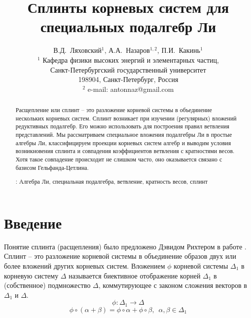 \documentclass[12pt]{article}
\begin{document}
\title{Сплинты корневых систем для специальных подалгебр Ли}

\author{В.Д.~Ляховский$^1$, А.А.~Назаров$^{1,2}$, П.И.~Какинь$^{1}$\\
  {\small $^1$ Кафедра физики высоких энергий и элементарных частиц,}\\ {\small Санкт-Петербургский государственный университет}\\
  {\small 198904, Санкт-Петербург, Россия}\\
  {\small $^{2}$ e-mail: antonnaz@gmail.com}}

\maketitle

\begin{abstract}
  Расщепление или сплинт -- это разложение корневой системы в объединение нескольких корневых
  систем. Сплинт возникает при изучении (регулярных) вложений редуктивных подалгебр. Его можно
  использовать для построения правил ветвления представлений. Мы рассматриваем специальное вложения
  подалгебры Ли в простые алгебры Ли, классифицируем проекции корневых систем алгебр и выводим
  условия возникновения сплинта и совпадения коэффициентов ветвления с кратностями весов. Хотя
  такое совпадение происходит не слишком часто, оно оказывается связано с базисом Гельфанда-Цетлина. 

: Алгебра Ли, специальная подалгебра, ветвление, кратность весов, сплинт
\end{abstract}


\section{Введение}
\label{sec:introduction}

Понятие сплинта (расщепления) было предложено Дэвидом Рихтером в работе \cite{richter2008splints}.
Сплинт -- это разложение корневой системы в объединение образов двух или более вложений других
корневых систем. Вложением  $\phi$ корневой системы $\Delta_1$ в корневую систему $\Delta$
называется биективное отображение корней $\Delta_{1}$ в (собственное) подмножество  $\Delta$,
коммутирующее с  законом сложения векторов в $\Delta_{1}$ и $\Delta$.
\begin{equation*}
\phi:\Delta_1 \longrightarrow \Delta
\end{equation*}
\begin{equation*}
\phi \circ (\alpha + \beta) =\phi \circ \alpha + \phi \circ \beta,
\,\,\, \alpha,\beta \in \Delta_1
\end{equation*}
\end{document}

